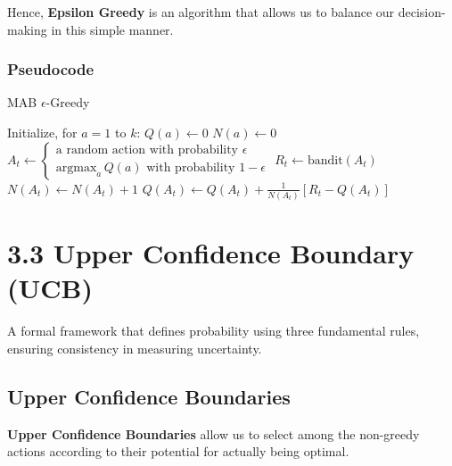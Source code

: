 \documentclass[
  letterpaper,
  DIV=11,
  numbers=noendperiod]{scrreprt}
\begin{document}
Hence, \textbf{Epsilon Greedy} is an algorithm that allows us to balance
our decision-making in this simple manner.

\subsection{Pseudocode}\label{pseudocode}

\begin{algorithm}[htb!]
\caption{MAB $\epsilon$-Greedy}
\begin{algorithmic}[1]
\State Initialize, for $a = 1$ to $k$:
\State $Q(a) \gets 0$ 
\State $N(a) \gets 0$ \\
    \State $A_t \gets
        \begin{cases}
            \text{a random action with probability } \epsilon \\
            \text{argmax}_a\, Q(a) \text{ with probability } 1-\epsilon 
        \end{cases}$
    \State $R_t \gets \text{bandit}(A_t)$
    \State $N(A_t) \gets N(A_t) + 1$
    \State $Q(A_t) \gets Q(A_t) + \frac{1}{N(A_t)}[R_t - Q(A_t)]$
\Endfor

\end{algorithmic}
\end{algorithm}

\chapter{3.3 Upper Confidence Boundary
(UCB)}\label{upper-confidence-boundary-ucb}

\begin{tcolorbox}[enhanced jigsaw, colback=white, left=2mm, breakable, opacityback=0, bottomrule=.15mm, rightrule=.15mm, arc=.35mm, colframe=quarto-callout-note-color-frame, leftrule=.75mm, toprule=.15mm]

A formal framework that defines probability using three fundamental
rules, ensuring consistency in measuring uncertainty. 🎲

\end{tcolorbox}

\section{Upper Confidence Boundaries}\label{upper-confidence-boundaries}

\textbf{Upper Confidence Boundaries} allow us to select among the
non-greedy actions according to their potential for actually being
optimal.
\end{document}
